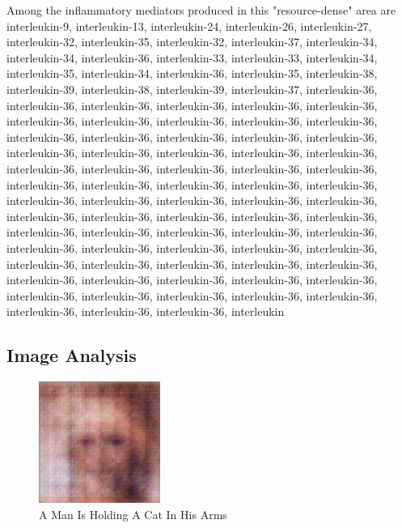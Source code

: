 \documentclass{article}%
\begin{document}
Among the inflammatory mediators produced in this "resource{-}dense" area are interleukin{-}9, interleukin{-}13, interleukin{-}24, interleukin{-}26, interleukin{-}27, interleukin{-}32, interleukin{-}35, interleukin{-}32, interleukin{-}37, interleukin{-}34, interleukin{-}34, interleukin{-}36, interleukin{-}33, interleukin{-}33, interleukin{-}34, interleukin{-}35, interleukin{-}34, interleukin{-}36, interleukin{-}35, interleukin{-}38, interleukin{-}39, interleukin{-}38, interleukin{-}39, interleukin{-}37, interleukin{-}36, interleukin{-}36, interleukin{-}36, interleukin{-}36, interleukin{-}36, interleukin{-}36, interleukin{-}36, interleukin{-}36, interleukin{-}36, interleukin{-}36, interleukin{-}36, interleukin{-}36, interleukin{-}36, interleukin{-}36, interleukin{-}36, interleukin{-}36, interleukin{-}36, interleukin{-}36, interleukin{-}36, interleukin{-}36, interleukin{-}36, interleukin{-}36, interleukin{-}36, interleukin{-}36, interleukin{-}36, interleukin{-}36, interleukin{-}36, interleukin{-}36, interleukin{-}36, interleukin{-}36, interleukin{-}36, interleukin{-}36, interleukin{-}36, interleukin{-}36, interleukin{-}36, interleukin{-}36, interleukin{-}36, interleukin{-}36, interleukin{-}36, interleukin{-}36, interleukin{-}36, interleukin{-}36, interleukin{-}36, interleukin{-}36, interleukin{-}36, interleukin{-}36, interleukin{-}36, interleukin{-}36, interleukin{-}36, interleukin{-}36, interleukin{-}36, interleukin{-}36, interleukin{-}36, interleukin{-}36, interleukin{-}36, interleukin{-}36, interleukin{-}36, interleukin{-}36, interleukin{-}36, interleukin{-}36, interleukin{-}36, interleukin{-}36, interleukin{-}36, interleukin{-}36, interleukin{-}36, interleukin{-}36, interleukin{-}36, interleukin{-}36, interleukin{-}36, interleukin

%
\subsection{Image Analysis}%
\label{subsec:ImageAnalysis}%


\begin{figure}[h!]%
\centering%
\includegraphics[width=150px]{500_fake_images/samples_5_449.png}%
\caption{A Man Is Holding A Cat In His Arms}%
\end{figure}

%
\end{document}

